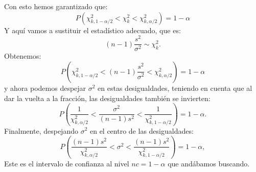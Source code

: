 Con esto hemos garantizado que:
    \[P(\chi^2_{k,1-\alpha/2}<\chi^2_k<\chi^2_{k,\alpha/2})=1-\alpha\]
Y aquí vamos a sustituir el estadístico adecuado, que es:
    \[(n-1)\dfrac{s^2}{\sigma^2}\sim\chi^2_k.\]
Obtenemos:
    \[P\left(\chi^2_{k,1-\alpha/2}<(n-1)\dfrac{s^2}{\sigma^2}<\chi^2_{k,\alpha/2}\right)=1-\alpha\]
y ahora podemos despejar $\sigma^2$ en estas desigualdades, teniendo en cuenta
que al dar la vuelta a la fracción, las desigualdades también se invierten:
    \[P\left(
    \dfrac{1}{\chi^2_{k,\alpha/2}}<\dfrac{\sigma^2}{(n-1)s^2}<\dfrac{1}{\chi^2_{k,1-\alpha/2}}
    \right)=1-\alpha.
    \]
Finalmente, despejando $\sigma^2$ en el centro de las desigualdades:
    \[P\left(
    \dfrac{(n-1)s^2}{\chi^2_{k,\alpha/2}}<\sigma^2<\dfrac{(n-1)s^2}{\chi^2_{k,1-\alpha/2}}
    \right)=1-\alpha,\]
Este es el intervalo de confianza al nivel $nc=1-\alpha$ que andábamos
buscando.

